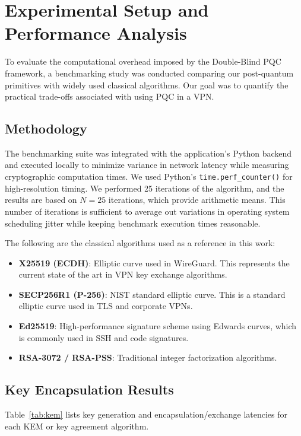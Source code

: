 \documentclass[10pt, conference, letterpaper]{IEEEtran}
\begin{document}
\section{Experimental Setup and Performance Analysis}
To evaluate the computational overhead imposed by the Double-Blind PQC framework, a benchmarking study was conducted comparing our post-quantum primitives with widely used classical algorithms. Our goal was to quantify the practical trade-offs associated with using PQC in a VPN.

\subsection{Methodology}
The benchmarking suite was integrated with the application's Python backend and executed locally to minimize variance in network latency while measuring cryptographic computation times. We used Python's \texttt{time.perf\_counter()} for high-resolution timing. We performed 25 iterations of the algorithm, and the results are based on $N = 25$ iterations, which provide arithmetic means. This number of iterations is sufficient to average out variations in operating system scheduling jitter while keeping benchmark execution times reasonable.

The following are the classical algorithms used as a reference in this work:
\begin{itemize}
    \item \textbf{X25519 (ECDH)}: Elliptic curve used in WireGuard. This represents the current state of the art in VPN key exchange algorithms.
    \item \textbf{SECP256R1 (P-256)}: NIST standard elliptic curve. This is a standard elliptic curve used in TLS and corporate VPNs.
    \item \textbf{Ed25519}: High-performance signature scheme using Edwards curves, which is commonly used in SSH and code signatures.
    \item \textbf{RSA-3072 / RSA-PSS}: Traditional integer factorization algorithms.
\end{itemize}

\subsection{Key Encapsulation Results}
Table~\ref{tab:kem} lists key generation and encapsulation/exchange latencies for each KEM or key agreement algorithm.
\end{document}
